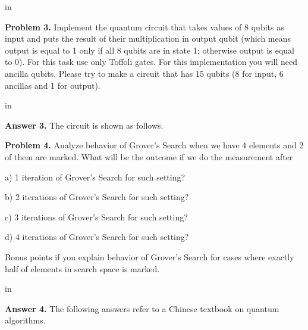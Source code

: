\documentclass[11pt]{article}
\begin{document}
 in

{\bf Problem 3.} Implement the quantum circuit that takes values of 8 qubits as input and puts the result of their multiplication in output qubit (which means output is equal to 1 only if all 8 qubits are in state 1; otherwise output is equal to 0). For this task use only Toffoli gates. For this implementation you will need ancilla qubits. Please try to make a circuit that has 15 qubits (8 for input, 6 ancillas and 1 for output).

 in

{\bf Answer 3.} The circuit is shown as follows.
\begin{figure}[h]
\end{figure}

\newpage
{\bf Problem 4.} Analyze behavior of Grover’s Search when we have 4 elements and 2 of them are marked. What will be the outcome if we do the measurement after

a) 1 iteration of Grover’s Search for such setting?

b) 2 iterations of Grover’s Search for such setting?

c) 3 iterations of Grover’s Search for such setting?

d) 4 iterations of Grover’s Search for such setting?

Bonus points if you explain behavior of Grover’s Search for cases where exactly half of 
elements in search space is marked.

 in

{\bf Answer 4.} The following answers refer to a Chinese textbook on quantum algorithms.
\end{document}
